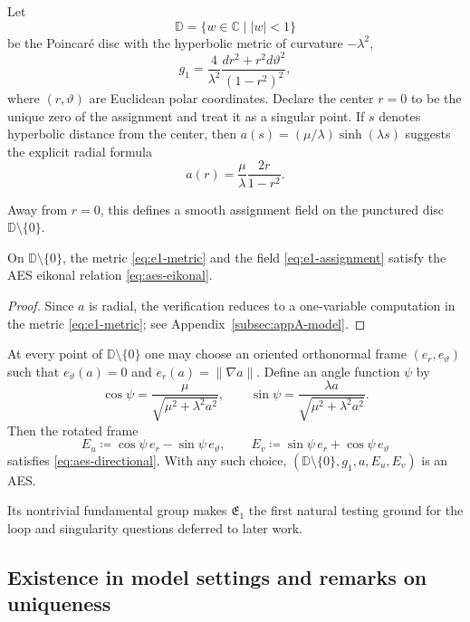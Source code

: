 Let
\[
\mathbb{D}=\{w\in\mathbb{C}\mid |w|<1\}
\]
be the Poincaré disc with the hyperbolic metric of curvature $-\lambda^2$,
\begin{equation}\label{eq:e1-metric}
g_1=\frac{4}{\lambda^2}\frac{dr^2+r^2 d\vartheta^2}{(1-r^2)^2},
\end{equation}
where $(r,\vartheta)$ are Euclidean polar coordinates. Declare the center $r=0$ to be the unique zero of the assignment and treat it as a singular point. If $s$ denotes hyperbolic distance from the center, then $a(s)=(\mu/\lambda)\sinh(\lambda s)$ suggests the explicit radial formula
\begin{equation}\label{eq:e1-assignment}
a(r)=\frac{\mu}{\lambda}\frac{2r}{1-r^2}.
\end{equation}

Away from $r=0$, this defines a smooth assignment field on the punctured disc $\mathbb{D}\setminus\{0\}$.

\begin{lemma}\label{lemma:aes-e1}
On $\mathbb{D}\setminus\{0\}$, the metric \eqref{eq:e1-metric} and the field \eqref{eq:e1-assignment} satisfy the AES eikonal relation \eqref{eq:aes-eikonal}.
\end{lemma}

\begin{proof}
Since $a$ is radial, the verification reduces to a one-variable computation in the metric \eqref{eq:e1-metric}; see Appendix~\ref{subsec:appA-model}.
\end{proof}

At every point of $\mathbb{D}\setminus\{0\}$ one may choose an oriented orthonormal frame $(e_r,e_\vartheta)$ such that $e_\vartheta(a)=0$ and $e_r(a)=\|\nabla a\|$. Define an angle function $\psi$ by
\[
\cos\psi=\frac{\mu}{\sqrt{\mu^2+\lambda^2 a^2}},
\qquad
\sin\psi=\frac{\lambda a}{\sqrt{\mu^2+\lambda^2 a^2}}.
\]
Then the rotated frame
\[
E_u\coloneqq \cos\psi\,e_r-\sin\psi\,e_\vartheta,
\qquad
E_v\coloneqq \sin\psi\,e_r+\cos\psi\,e_\vartheta
\]
satisfies \eqref{eq:aes-directional}. With any such choice, $(\mathbb{D}\setminus\{0\},g_1,a,E_u,E_v)$ is an AES.

Its nontrivial fundamental group makes $\mathfrak{E}_1$ the first natural testing ground for the loop and singularity questions deferred to later work.

\subsection{Existence in model settings and remarks on uniqueness}\label{subsec:aes-existence}

